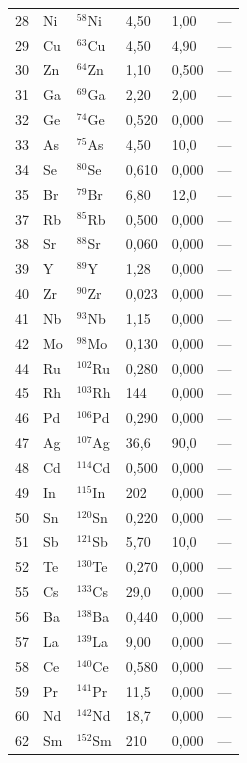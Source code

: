 \documentclass[12pt,a4paper]{article}
\begin{document}
\begin{longtable}{p{0.8cm}p{1.2cm}p{2.0cm}p{2.5cm}p{2.5cm}p{2.5cm}}
		28 & Ni & \(^{58}\)Ni & 4,50 & 1,00 & --- \\
		29 & Cu & \(^{63}\)Cu & 4,50 & 4,90 & --- \\
		30 & Zn & \(^{64}\)Zn & 1,10 & 0,500 & --- \\
		31 & Ga & \(^{69}\)Ga & 2,20 & 2,00 & --- \\
		32 & Ge & \(^{74}\)Ge & 0,520 & 0,000 & --- \\
		33 & As & \(^{75}\)As & 4,50 & 10,0 & --- \\
		34 & Se & \(^{80}\)Se & 0,610 & 0,000 & --- \\
		35 & Br & \(^{79}\)Br & 6,80 & 12,0 & --- \\
		37 & Rb & \(^{85}\)Rb & 0,500 & 0,000 & --- \\
		38 & Sr & \(^{88}\)Sr & 0,060 & 0,000 & --- \\
		39 & Y  & \(^{89}\)Y & 1,28 & 0,000 & --- \\
		40 & Zr & \(^{90}\)Zr & 0,023 & 0,000 & --- \\
		41 & Nb & \(^{93}\)Nb & 1,15 & 0,000 & --- \\
		42 & Mo & \(^{98}\)Mo & 0,130 & 0,000 & --- \\
		44 & Ru & \(^{102}\)Ru & 0,280 & 0,000 & --- \\
		45 & Rh & \(^{103}\)Rh & 144 & 0,000 & --- \\
		46 & Pd & \(^{106}\)Pd & 0,290 & 0,000 & --- \\
		47 & Ag & \(^{107}\)Ag & 36,6 & 90,0 & --- \\
		48 & Cd & \(^{114}\)Cd & 0,500 & 0,000 & --- \\
		49 & In & \(^{115}\)In & 202 & 0,000 & --- \\
		50 & Sn & \(^{120}\)Sn & 0,220 & 0,000 & --- \\
		51 & Sb & \(^{121}\)Sb & 5,70 & 10,0 & --- \\
		52 & Te & \(^{130}\)Te & 0,270 & 0,000 & --- \\
		55 & Cs & \(^{133}\)Cs & 29,0 & 0,000 & --- \\
		56 & Ba & \(^{138}\)Ba & 0,440 & 0,000 & --- \\
		57 & La & \(^{139}\)La & 9,00 & 0,000 & --- \\
		58 & Ce & \(^{140}\)Ce & 0,580 & 0,000 & --- \\
		59 & Pr & \(^{141}\)Pr & 11,5 & 0,000 & --- \\
		60 & Nd & \(^{142}\)Nd & 18,7 & 0,000 & --- \\
		62 & Sm & \(^{152}\)Sm & 210 & 0,000 & --- \\

\end{longtable}
\end{document}
